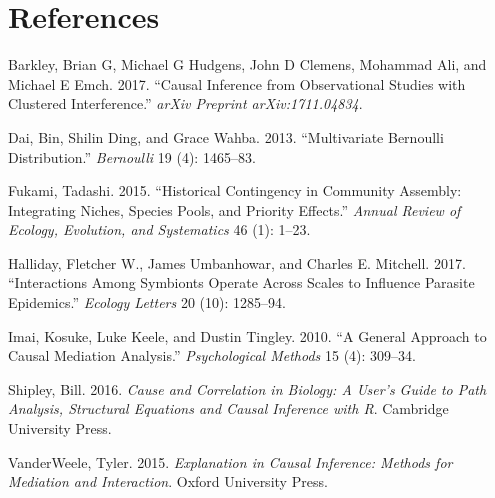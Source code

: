 \documentclass[]{article}
\begin{document}
\hypertarget{references}{%
\section*{References}\label{references}}

\hypertarget{refs}{}
\leavevmode\hypertarget{ref-barkley2017causal}{}%
Barkley, Brian G, Michael G Hudgens, John D Clemens, Mohammad Ali, and
Michael E Emch. 2017. ``Causal Inference from Observational Studies with
Clustered Interference.'' \emph{arXiv Preprint arXiv:1711.04834}.

\leavevmode\hypertarget{ref-dai2013multivariate}{}%
Dai, Bin, Shilin Ding, and Grace Wahba. 2013. ``Multivariate Bernoulli
Distribution.'' \emph{Bernoulli} 19 (4): 1465--83.

\leavevmode\hypertarget{ref-fukami2015historical}{}%
Fukami, Tadashi. 2015. ``Historical Contingency in Community Assembly:
Integrating Niches, Species Pools, and Priority Effects.'' \emph{Annual
Review of Ecology, Evolution, and Systematics} 46 (1): 1--23.

\leavevmode\hypertarget{ref-halliday2017interactions}{}%
Halliday, Fletcher W., James Umbanhowar, and Charles E. Mitchell. 2017.
``Interactions Among Symbionts Operate Across Scales to Influence
Parasite Epidemics.'' \emph{Ecology Letters} 20 (10): 1285--94.

\leavevmode\hypertarget{ref-imai2010general}{}%
Imai, Kosuke, Luke Keele, and Dustin Tingley. 2010. ``A General Approach
to Causal Mediation Analysis.'' \emph{Psychological Methods} 15 (4):
309--34.

\leavevmode\hypertarget{ref-shipley2016cause}{}%
Shipley, Bill. 2016. \emph{Cause and Correlation in Biology: A User's
Guide to Path Analysis, Structural Equations and Causal Inference with
R}. Cambridge University Press.

\leavevmode\hypertarget{ref-vanderweele2015explanation}{}%
VanderWeele, Tyler. 2015. \emph{Explanation in Causal Inference: Methods
for Mediation and Interaction}. Oxford University Press.
\end{document}
